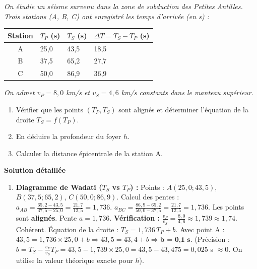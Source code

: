 \documentclass[11pt]{article}
\begin{document}
\begin{exoresolu}
\emph{On étudie un séisme survenu dans la zone de subduction des Petites Antilles. Trois stations (A, B, C) ont enregistré les temps d'arrivée (en s) :}
\begin{center}
\begin{tabularx}{\linewidth}{|c|X|X|X|}\hline
\rowcolor{popblueL}
\textbf{Station} & \textbf{$T_P$ (s)} & \textbf{$T_S$ (s)} & \textbf{$\Delta T = T_S - T_P$ (s)} \\ \hline
A & 25,0 & 43,5 & 18,5 \\ \hline
B & 37,5 & 65,2 & 27,7 \\ \hline
C & 50,0 & 86,9 & 36,9 \\ \hline
\end{tabularx}
\end{center}
\emph{On admet $v_P = 8,0$ km/s et $v_S = 4,6$ km/s constants dans le manteau supérieur.}
\begin{enumerate}
    \item Vérifier que les points $(T_P, T_S)$ sont alignés et déterminer l'équation de la droite $T_S = f(T_P)$.
    \item En déduire la profondeur du foyer $h$.
    \item Calculer la distance épicentrale de la station A.
\end{enumerate}
\tcblower
\textbf{Solution détaillée}
\begin{enumerate}
    \item \textbf{Diagramme de Wadati ($T_S$ vs $T_P$) :}
    Points : $A(25,0; 43,5)$, $B(37,5; 65,2)$, $C(50,0; 86,9)$.
    Calcul des pentes :
    $a_{AB} = \frac{65,2 - 43,5}{37,5 - 25,0} = \frac{21,7}{12,5} = 1,736$.
    $a_{BC} = \frac{86,9 - 65,2}{50,0 - 37,5} = \frac{21,7}{12,5} = 1,736$.
    Les points sont \textbf{alignés}. Pente $a = 1,736$.
    \textbf{Vérification :} $\frac{v_P}{v_S} = \frac{8,0}{4,6} \approx 1,739 \approx 1,74$. Cohérent.
    Équation de la droite : $T_S = 1,736 \, T_P + b$.
    Avec point A : $43,5 = 1,736 \times 25,0 + b \Rightarrow 43,5 = 43,4 + b \Rightarrow \textbf{b = 0,1 s}$.
    (Précision : $b = T_S - \frac{v_P}{v_S} T_P = 43,5 - 1,739 \times 25,0 = 43,5 - 43,475 = 0,025$ s $\approx 0$. On utilise la valeur théorique exacte pour $h$).
    

\end{enumerate}
\end{exoresolu}
\end{document}

